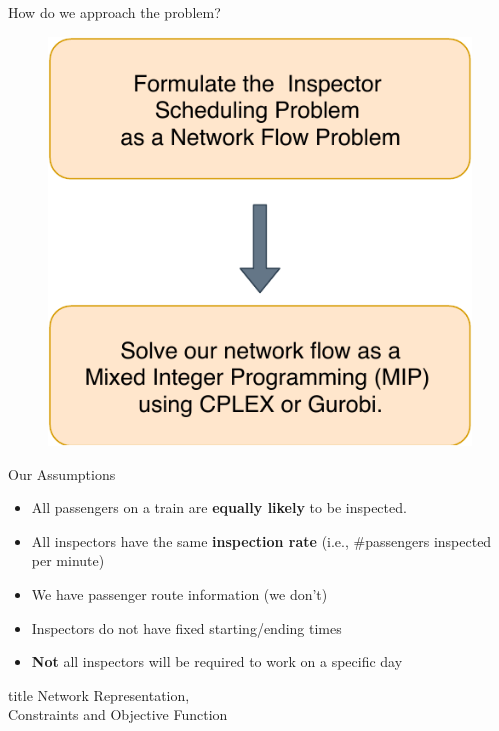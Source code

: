 \documentclass[handout]{beamer}
\begin{document}
\begin{frame}{How do we approach the problem?}
\begin{figure}
    \centering
    \includegraphics[scale=.7]{steps.pdf}
\end{figure}
\end{frame}

\begin{frame}{Our Assumptions}
    \begin{itemize}
        \item All passengers on a train 
        are \textbf{equally likely} to be inspected.
        \item All inspectors have the same \textbf{inspection rate} (i.e., 
        \#passengers inspected per minute)
        \item We have passenger route information (we don't)
        \item Inspectors do not have fixed starting/ending times
        \item \textbf{Not} all inspectors will be required to work on a specific day
    \end{itemize}
\end{frame}

\begin{frame}
  \vfill
  \centering
  \begin{beamercolorbox}[sep=8pt,center,shadow=true,rounded=true]{title}
     Network Representation,\\
    Constraints and Objective Function \par%
  \end{beamercolorbox}
  \vfill
  \end{frame}
  
\end{document}

